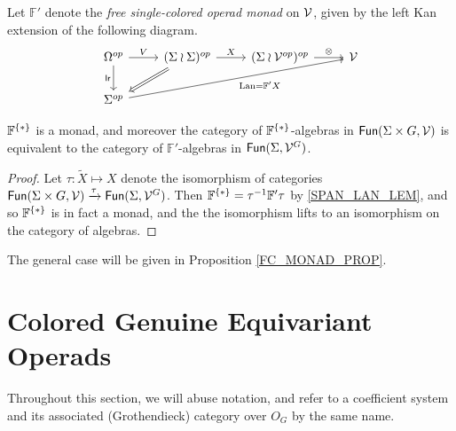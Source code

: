 \documentclass[a4paper,10pt
,draft
]{article}%
\renewcommand{\1}{\ensuremath{\mathbb{id}}}
\begin{document}
\begin{notation}[\cite{BP17}]
      Let $\mathbb F'$ denote the \textit{free single-colored operad monad} on $\mathcal V$, given by the left Kan extension of the following diagram.
      \begin{equation}
            \begin{tikzcd}
                  \Omega^{op}
                  \arrow[d, "\mathsf{lr}"']
                  \arrow[r, "V"]
                  &
                  (\Sigma \wr \Sigma)^{op} \arrow[r, "X"]
                  \arrow[dl, Rightarrow]
                  &
                  (\Sigma \wr \V^{op})^{op} \arrow[r, "\otimes"]
                  &
                  \V
                  \\
                  \Sigma^{op} \arrow[urrr, "\Lan = \mathbb F' X"']
            \end{tikzcd}
      \end{equation}
\end{notation}

\begin{proposition}
      \label{TEST_PROP}
      $\mathbb F^{\set{\**}}$ is a monad, and moreover
      the category of $\mathbb F^{\set{\**}}$-algebras in $\mathsf{Fun}(\Sigma \times G, \mathcal V)$ is equivalent to
      the category of $\mathbb F'$-algebras in $\mathsf{Fun}(\Sigma, \mathcal V^G)$.
\end{proposition}
\begin{proof}
      Let $\tau: \tilde X \mapsto X$ denote the isomorphism of categories
      $\mathsf{Fun}(\Sigma \times G, \mathcal V) \xrightarrow{\tau} \mathsf{Fun}(\Sigma, \mathcal V^G)$.
      Then $\mathbb F^{\set{\**}} = \tau^{-1} \mathbb F' \tau$ by \ref{SPAN_LAN_LEM}, and so
      $\mathbb F^{\set{\**}}$ is in fact a monad, and the
      the isomorphism lifts to an isomorphism on the category of algebras.
\end{proof}

The general case will be given in Proposition \ref{FC_MONAD_PROP}.





\newpage

\section{Colored Genuine Equivariant Operads}

Throughout this section, we will abuse notation, and refer to
a coefficient system and its associated (Grothendieck) category over $O_G$ by the same name.
\end{document}
